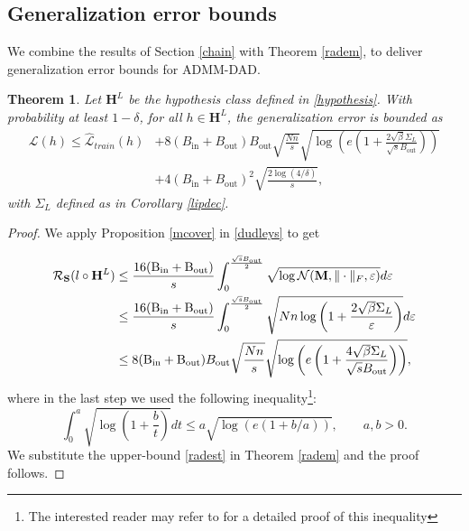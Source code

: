 \documentclass[preprint,12pt]{elsarticle}
\newtheorem{theorem}{Theorem}[section]
\begin{document}
\subsection{Generalization error bounds}\label{genbounds}
We combine the results of Section \ref{chain} with Theorem \ref{radem}, to deliver generalization error bounds for ADMM-DAD.
\begin{theorem}\label{gentheorem}
Let $\mathbf{H}^L$ be the hypothesis class defined in \eqref{hypothesis}. With probability at least $1-\delta$, for all $h\in\mathbf{H}^L$, the generalization error is bounded as
\begin{equation}
    \begin{split}
    \mathcal{L}(h)\leq\mathcal{\hat{L}}_{train}(h)&+8(B_{\mathrm{in}}+B_{\mathrm{out}})B_{\mathrm{out}}\sqrt{\frac{Nn}{s}}\sqrt{\log\left(e\left(1+\frac{2\sqrt{\beta }\Sigma_L}{\sqrt{s}B_{\mathrm{out}}}\right)\right)}\\   &+4(B_{\mathrm{in}}+B_{\mathrm{out}})^2\sqrt{\frac{2\log(4/\delta)}{s}},
    \end{split}
\end{equation}
with $\Sigma_L$ defined as in Corollary \ref{lipdec}.
\end{theorem}

\begin{proof}
We apply Proposition \ref{mcover} in \eqref{dudleys} to get

\begin{align}
    \mathcal{R}_\mathbf{S}(l\circ\mathbf{H}^L)&\leq\frac{16(\mathrm{B_{in}}+\mathrm{B_{out}})}{s}\int_0^{\frac{\sqrt{s}B_{\mathrm{out}}}{2}}\sqrt{\log\mathcal{N}(\mathbf{M},\|\cdot\|_F,\varepsilon)}d\varepsilon\notag\\
    &\leq\frac{16(\mathrm{B_{in}}+\mathrm{B_{out}})}{s}\int_0^{\frac{\sqrt{s}B_{\mathrm{out}}}{2}}\sqrt{Nn\log\left(1+\frac{2\sqrt{\beta }\Sigma_L}{\varepsilon}\right)}d\varepsilon\notag\\
    \label{radest}
    &\leq8(\mathrm{B_{in}}+\mathrm{B_{out}})B_{\mathrm{out}}\sqrt{\frac{Nn}{s}}\sqrt{\log\left(e\left(1+\frac{4\sqrt{\beta }\Sigma_L}{\sqrt{s}B_{\mathrm{out}}}\right)\right)},
\end{align}
where in the last step we used the following inequality\footnote{The interested reader may refer to \cite[Lemma C.9]{rf} for a detailed proof of this inequality}:
\begin{equation*}
    \int_0^a\sqrt{\log\left(1+\frac{b}{t}\right)}dt\leq a\sqrt{\log(e(1+b/a))},\qquad a,b>0.
\end{equation*}
We substitute the upper-bound \eqref{radest} in Theorem \ref{radem} and the proof follows.
\end{proof}
\end{document}
